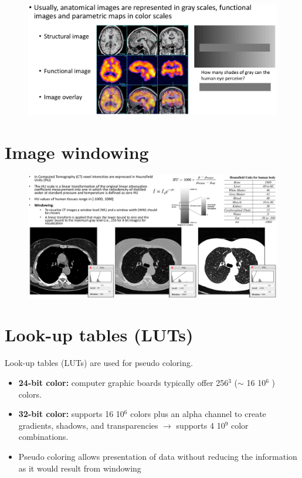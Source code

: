 \begin{figure}[ht]
	\centering
	\includegraphics[width=0.8\linewidth]{figure_med/gray}
\end{figure}
\FloatBarrier

\section{Image windowing}

\begin{figure}[ht]
	\centering
	\includegraphics[width=0.9\linewidth]{figure_med/img_windowing}
\end{figure}
\FloatBarrier

\section{Look-up tables (LUTs)}

Look-up tables (LUTs) are used for pseudo coloring.
\begin{itemize}
	\item \textbf{24-bit color:} computer graphic boards typically offer 256$^3$ ($\sim$ 16 10$^6$ ) colors.
	\item \textbf{32-bit color:} supports 16 10$^6$ colors plus an alpha channel to create gradients,
	shadows, and transparencies $\rightarrow$ supports 4 10$^9$ color combinations.
	\item Pseudo coloring allows presentation of data without reducing the information as it
	would result from windowing
\end{itemize}

